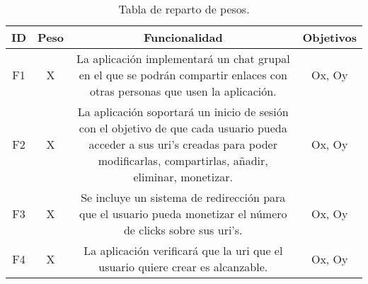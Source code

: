 \documentclass{article}
\begin{document}
\begin{table}[hbtp]
    \footnotesize
    \centering
    \settowidth{}
    \setlength\extrarowheight{5pt}
    \begin{tabulary}{\textwidth}{ C C C C}
        \textbf{ID} & 
        \textbf{Peso} & 
        \textbf{Funcionalidad} & 
        \textbf{Objetivos}\\
    \hline
    \hline
        F1 & 
        X & 
        La aplicación implementará un chat grupal en el que se podrán compartir enlaces con otras personas que usen la aplicación. &
        Ox, Oy\\
    \hline  
        F2 &
        X &
        La aplicación soportará un inicio de sesión con el objetivo de que cada usuario pueda acceder a sus uri's creadas para poder modificarlas, compartirlas, añadir, eliminar, monetizar. &
        Ox, Oy\\
    \hline
        F3 &
        X &
        Se incluye un sistema de redirección para que el usuario pueda monetizar el número de clicks sobre sus uri's. &
        Ox, Oy\\
    \hline
        F4 &
        X &
        La aplicación verificará que la uri que el usuario quiere crear es alcanzable. &
        Ox, Oy

    \end{tabulary}
    \caption{Tabla de reparto de pesos.}
    \label{XXX}
\end{table}

 
\end{document}
